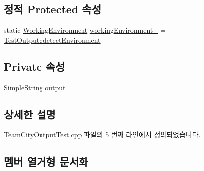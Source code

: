 \subsection*{정적 Protected 속성}
\begin{DoxyCompactItemize}
\item 
static \hyperlink{class_test_output_a0541851f863713454486a9fb3080f766}{Working\+Environment} \hyperlink{class_test_output_a8b622cfce4b95599cd31b61a777d68ef}{working\+Environment\+\_\+} = \hyperlink{class_test_output_a0541851f863713454486a9fb3080f766a3f11f791db94db142e33c3c75442ed10}{Test\+Output\+::detect\+Environment}
\end{DoxyCompactItemize}
\subsection*{Private 속성}
\begin{DoxyCompactItemize}
\item 
\hyperlink{class_simple_string}{Simple\+String} \hyperlink{class_team_city_output_to_buffer_a3da6195a18b2c45dff4c9b8a4e31e5c8}{output}
\end{DoxyCompactItemize}


\subsection{상세한 설명}


Team\+City\+Output\+Test.\+cpp 파일의 5 번째 라인에서 정의되었습니다.



\subsection{멤버 열거형 문서화}
